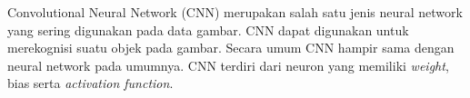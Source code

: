 Convolutional Neural Network (CNN) merupakan salah satu jenis neural network yang sering digunakan pada data gambar. CNN dapat digunakan untuk merekognisi suatu objek pada gambar.
Secara umum CNN hampir sama dengan neural network pada umumnya. CNN terdiri dari neuron yang memiliki \textit{weight}, bias serta \textit{activation function}.
